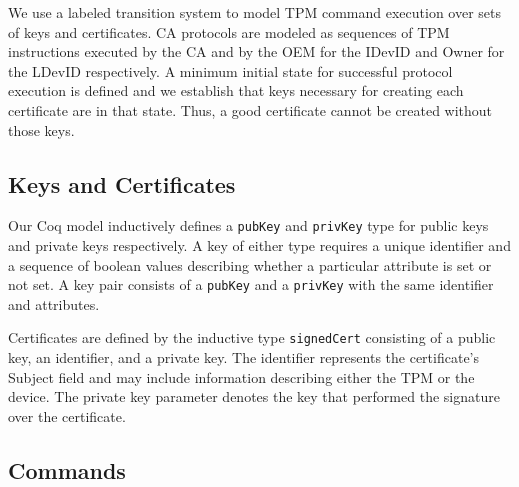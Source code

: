 \documentclass[runningheads]{llncs}
\begin{document}
We use a labeled transition system to model TPM command execution over
sets of keys and certificates.  CA protocols are modeled as sequences
of TPM instructions executed by the CA and by the OEM for the IDevID
and Owner for the LDevID respectively. A minimum initial state for
successful protocol execution is defined and we establish that keys
necessary for creating each certificate are in that state.  Thus, a
good certificate cannot be created without those keys.

\subsection{Keys and Certificates}

Our Coq model inductively defines a \verb|pubKey| and \verb|privKey|
type for public keys and private keys respectively. A key of either
type requires a unique identifier and a sequence of boolean values
describing whether a particular attribute is set or not set. A key
pair consists of a \verb|pubKey| and a \verb|privKey| with the same
identifier and attributes.



Certificates are defined by the inductive type \verb|signedCert|
consisting of a public key, an identifier, and a private key. The
identifier represents the certificate's Subject field and may include
information describing either the TPM or the device. The private key
parameter denotes the key that performed the signature over the
certificate.



\subsection{Commands}
\end{document}

